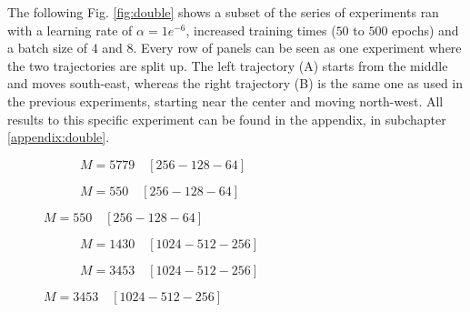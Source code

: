 \par
The following Fig. \ref{fig:double} shows a subset of the series of experiments ran with a learning rate of $\alpha=1e^{-6}$, increased training times ($50$ to $500$ epochs) and a batch size of $4$ and $8$. Every row of panels can be seen as one experiment where the two trajectories are split up. The left trajectory (A) starts from the middle and moves south-east, whereas the right trajectory (B) is the same one as used in the previous experiments, starting near the center and moving north-west. All results to this specific experiment can be found in the appendix, in subchapter \ref{appendix:double}.
\begin{figure}[H]
     \centering
     \begin{subfigure}[b]{0.48\textwidth}
         \centering
             
         \caption{$M=5779  \quad [256-128-64]$}
         \label{fig:double3}
     \end{subfigure}
          \hfill
               \begin{subfigure}[b]{0.48\textwidth}
         \centering
             
         \caption{$M=550 \quad [256-128-64]$}
         \label{fig:double4}
     \end{subfigure}
\end{figure}
\begin{figure}[H]\ContinuedFloat
     \begin{subfigure}[b]{0.48\textwidth}
         \centering
       
         \caption{$M=1430  \quad [1024-512-256]$}
         \label{fig:double1}
     \end{subfigure}
     \hfill
     \begin{subfigure}[b]{0.48\textwidth}
         \centering
             
         \caption{$M=3453  \quad [1024-512-256] $}
         \label{fig:double2}
     \end{subfigure}
\end{figure}
